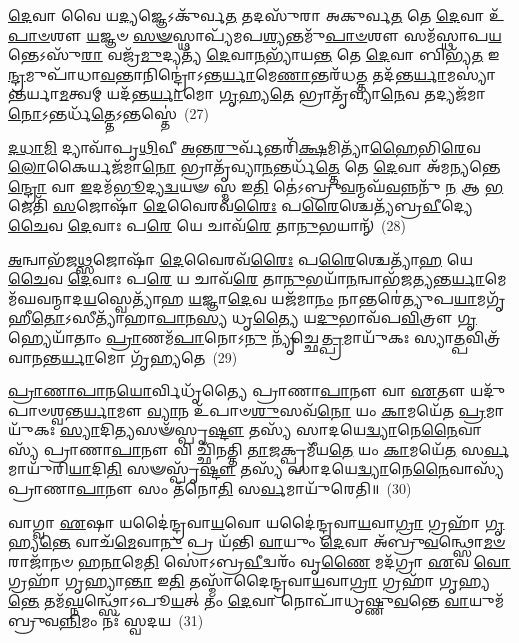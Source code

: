 \-\ul{𑌦𑍇}\-𑌵𑌾 𑌵𑍈 𑌯\-\ul{𑌦𑍍𑌯}\-𑌜𑍍𑌞𑍇\-𑌽𑌕𑍁᳴𑌰𑍍𑌵\-\ul{𑌤} 𑌤𑌦𑌸𑍁᳴𑌰𑌾 𑌅𑌕𑍁𑌰𑍍𑌵\-\ul{𑌤} 𑌤𑍇 \ul{𑌦𑍇}\-𑌵𑌾 𑌉᳴\-\ul{𑌪𑌾}\-\-\ul{𑍞}\-𑌶𑍗 \ul{𑌯}\-𑌜𑍍𑌞𑍞 \ul{𑌸}\-\-\ul{𑍟}\-𑌸𑍍𑌥𑌾𑌪𑍍𑌯᳴𑌮𑌪\-\ul{𑌶𑍍𑌯}\-𑌨𑍍𑌤𑌮𑍁᳴\-\ul{𑌪𑌾}\-\-\ul{𑍞}\-𑌶𑍗 𑌸𑌮᳴𑌸𑍍𑌥𑌾𑌪\-\ul{𑌯}\-𑌨𑍍𑌤𑍇\-𑌽𑌸𑍁᳴\-\ul{𑌰𑌾} 𑌵𑌜𑍍𑌰᳴\-\ul{𑌮𑍁}\-𑌦𑍍𑌯𑌤𑍍𑌯᳴ \ul{𑌦𑍇}\-𑌵𑌾\-\ul{𑌨}\-𑌭𑍍𑌯𑌾᳴𑌯\-\ul{𑌨𑍍𑌤} 𑌤𑍇 \ul{𑌦𑍇}\-𑌵𑌾 𑌬𑌿𑌭𑍍𑌯᳴\-\ul{𑌤} 𑌇\-\ul{𑌨𑍍𑌦𑍍𑌰}\-𑌮𑍁𑌪𑌾᳴𑌧𑌾\-\ul{𑌵}\-𑌨𑍍𑌤𑌾𑌨𑌿𑌨𑍍𑌦𑍍𑌰𑍋॑\-𑌽𑌨𑍍𑌤\-\ul{𑌰𑍍𑌯𑌾}\-𑌮𑍇\-\ul{𑌣𑌾}\-𑌨𑍍𑌤𑌰᳴𑌧\-\ul{𑌤𑍍𑌤} 𑌤𑌦᳴𑌨𑍍𑌤\-\ul{𑌰𑍍𑌯𑌾}\-𑌮𑌸𑍍𑌯𑌾॑𑌨𑍍𑌤𑌰𑍍𑌯𑌾\-\ul{𑌮}\-𑌤𑍍𑌵𑌮𑍍 𑌯𑌦᳴𑌨𑍍𑌤\-\ul{𑌰𑍍𑌯𑌾}\-𑌮𑍋 \ul{𑌗𑍃}\-𑌹𑍍𑌯\-\ul{𑌤𑍇} 𑌭𑍍𑌰𑌾𑌤𑍃᳴𑌵𑍍𑌯𑌾\-\ul{𑌨𑍇}\-𑌵 𑌤𑌦𑍍𑌯𑌜᳴𑌮𑌾\-\ul{𑌨𑍋}\-\-𑌽𑌨𑍍𑌤𑌰𑍍𑌧᳴\-\ul{𑌤𑍍𑌤𑍇}\-\-𑌽𑌨𑍍𑌤𑌸𑍍𑌤𑍇॑~(27)

\-\ul{𑌦}\-\-\ul{𑌧𑌾}\-\-\ul{𑌮𑌿} 𑌦𑍍𑌯𑌾𑌵𑌾᳴𑌪𑍃\-\ul{𑌥𑌿}\-𑌵𑍀 \ul{𑌅}\-𑌨𑍍𑌤\-\ul{𑌰𑍁}\-𑌰𑍍𑌵᳴𑌨𑍍𑌤𑌰𑌿᳴\-\ul{𑌕𑍍𑌷}\-𑌮𑌿𑌤𑍍𑌯𑌾᳴\-\ul{𑌹𑍈}\-𑌭𑌿\-\ul{𑌰𑍇}\-𑌵 \ul{𑌲𑍋}\-𑌕𑍈𑌰𑍍𑌯𑌜᳴𑌮𑌾\-\ul{𑌨𑍋} 𑌭𑍍𑌰𑌾𑌤𑍃᳴𑌵𑍍𑌯𑌾\-\ul{𑌨}\-𑌨𑍍𑌤𑌰𑍍𑌧᳴\-\ul{𑌤𑍍𑌤𑍇} 𑌤𑍇 \ul{𑌦𑍇}\-𑌵𑌾 𑌅᳴𑌮\-\ul{𑌨𑍍𑌯}\-𑌨𑍍𑌤𑍇\-\ul{𑌨𑍍𑌦𑍍𑌰𑍋} 𑌵𑌾 \ul{𑌇}\-𑌦𑌮᳴\-\ul{𑌭𑍂}\-𑌦𑍍𑌯\-\ul{𑌦𑍍𑌵}\-𑌯𑍟 𑌸𑍍𑌮 𑌇\-\ul{𑌤𑌿} 𑌤𑍇॑\-𑌽𑌬𑍍𑌰𑍁\-\ul{𑌵}\-𑌨𑍍𑌮𑌘᳴\-\ul{𑌵}\-𑌨𑍍𑌨𑌨𑍁᳴ \ul{𑌨} 𑌆 \ul{𑌭}\-𑌜𑍇𑌤𑌿᳴ \ul{𑌸}\-𑌜𑍋𑌷𑌾᳴ \ul{𑌦𑍇}\-𑌵𑍈𑌰𑌵᳴\-\ul{𑌰𑍈𑌃} 𑌪\-\ul{𑌰𑍈}\-𑌶𑍍𑌚𑍇𑌤𑍍𑌯᳴𑌬𑍍𑌰\-\ul{𑌵𑍀}\-𑌦𑍍𑌯𑍇 \ul{𑌚𑍈}\-𑌵 \ul{𑌦𑍇}\-𑌵𑌾𑌃 𑌪\-\ul{𑌰𑍇} 𑌯𑍇 𑌚𑌾𑌵᳴\-\ul{𑌰𑍇} 𑌤𑌾\-\ul{𑌨𑍁}\-𑌭𑌯𑌾𑌨𑍍᳴~(28)

\-\ul{𑌅}\-𑌨𑍍𑌵𑌾𑌭᳴𑌜\-\ul{𑌥𑍍𑌸}\-𑌜𑍋𑌷𑌾᳴ \ul{𑌦𑍇}\-𑌵𑍈𑌰𑌵᳴\-\ul{𑌰𑍈𑌃} 𑌪\-\ul{𑌰𑍈}\-𑌶𑍍𑌚𑍇𑌤𑍍𑌯𑌾᳴\-\ul{𑌹} 𑌯𑍇 \ul{𑌚𑍈}\-𑌵 \ul{𑌦𑍇}\-𑌵𑌾𑌃 𑌪\-\ul{𑌰𑍇} 𑌯 𑌚𑌾𑌵᳴\-\ul{𑌰𑍇} 𑌤𑌾\-\ul{𑌨𑍁}\-𑌭𑌯𑌾᳴\-\ul{𑌨}\-𑌨𑍍𑌵𑌾𑌭᳴𑌜𑌤𑍍𑌯𑌨𑍍𑌤\-\ul{𑌰𑍍𑌯𑌾}\-𑌮𑍇 𑌮᳴𑌘𑌵𑌨𑍍𑌮𑌾𑌦\-\ul{𑌯}\-𑌸𑍍𑌵𑍇𑌤𑍍𑌯𑌾᳴𑌹 \ul{𑌯}\-𑌜𑍍𑌞𑌾\-\ul{𑌦𑍇}\-𑌵 𑌯𑌜᳴𑌮𑌾\-\ul{𑌨𑌂} 𑌨𑌾𑌨𑍍𑌤𑌰𑍇॑𑌤𑍍𑌯𑍁𑌪\-\ul{𑌯𑌾}\-𑌮𑌗𑍃᳴𑌹𑍀\-\ul{𑌤𑍋}\-\-𑌽𑌸𑍀𑌤𑍍𑌯𑌾᳴𑌹𑌾\-\ul{𑌪𑌾}\-𑌨\-\ul{𑌸𑍍𑌯} 𑌧𑍃\-\ul{𑌤𑍍𑌯𑍈} 𑌯\-\ul{𑌦𑍁}\-𑌭𑌾𑌵᳴𑌪\-\ul{𑌵𑌿}\-𑌤𑍍𑌰𑍗 \ul{𑌗𑍃}\-𑌹𑍍𑌯𑍇𑌯𑌾᳴𑌤𑌾𑌂 \ul{𑌪𑍍𑌰𑌾}\-𑌣𑌮᳴\-\ul{𑌪𑌾}\-𑌨𑍋\-𑌽\-\ul{𑌨𑍁} 𑌨𑍍𑌯𑍃᳴𑌚𑍍𑌛𑍇\-\ul{𑌤𑍍𑌪𑍍𑌰}\-𑌮𑌾𑌯𑍁᳴𑌕𑌃 𑌸𑍍𑌯𑌾\-\ul{𑌤𑍍𑌪}\-𑌵𑌿𑌤𑍍𑌰᳴𑌵𑌾𑌨𑌨𑍍𑌤\-\ul{𑌰𑍍𑌯𑌾}\-𑌮𑍋 𑌗𑍃᳴𑌹𑍍𑌯𑌤𑍇~(29)

\-\ul{𑌪𑍍𑌰𑌾}\-\-\ul{𑌣𑌾}\-\-\ul{𑌪𑌾}\-𑌨\-\ul{𑌯𑍋}\-𑌰𑍍𑌵𑌿𑌧𑍃᳴𑌤𑍍𑌯𑍈 𑌪𑍍𑌰𑌾𑌣𑌾\-\ul{𑌪𑌾}\-𑌨𑍗 𑌵𑌾 \ul{𑌏}\-𑌤𑍗 𑌯𑌦𑍁᳴𑌪𑌾𑍞𑌶𑍍𑌵𑌨𑍍𑌤\-\ul{𑌰𑍍𑌯𑌾}\-𑌮𑍗 \ul{𑌵𑍍𑌯𑌾}\-𑌨 𑌉᳴𑌪𑌾𑍞\-\ul{𑌶𑍁}\-𑌸𑌵᳴\-\ul{𑌨𑍋} 𑌯𑌂 \ul{𑌕𑌾}\-𑌮𑌯𑍇᳴𑌤 \ul{𑌪𑍍𑌰}\-𑌮𑌾𑌯𑍁᳴𑌕𑌃 \ul{𑌸𑍍𑌯𑌾}\-𑌦𑌿𑌤𑍍𑌯𑌸𑍟᳴𑌸𑍍𑌪𑍃\-\ul{𑌷𑍍𑌟𑍗} 𑌤𑌸𑍍𑌯᳴ 𑌸𑌾𑌦𑌯𑍇\-\ul{𑌦𑍍𑌵𑍍𑌯𑌾}\-𑌨𑍇\-\ul{𑌨𑍈}\-𑌵𑌾𑌸𑍍𑌯᳴ 𑌪𑍍𑌰𑌾𑌣𑌾\-\ul{𑌪𑌾}\-𑌨𑍗 𑌵𑌿 𑌚𑍍𑌛𑌿᳴𑌨𑌤𑍍𑌤𑌿 \ul{𑌤𑌾}\-𑌜𑌕𑍍𑌪𑍍𑌰𑌮𑍀᳴𑌯\-\ul{𑌤𑍇} 𑌯𑌂 \ul{𑌕𑌾}\-𑌮𑌯𑍇᳴\-\ul{𑌤} 𑌸\-\ul{𑌰𑍍𑌵}\-𑌮𑌾𑌯𑍁᳴𑌰𑌿\-\ul{𑌯𑌾}\-𑌦𑌿\-\ul{𑌤𑌿} 𑌸𑍟𑌸𑍍𑌪𑍃᳴\-\ul{𑌷𑍍𑌟𑍗} 𑌤𑌸𑍍𑌯᳴ 𑌸𑌾𑌦𑌯𑍇\-\ul{𑌦𑍍𑌵𑍍𑌯𑌾}\-𑌨𑍇\-\ul{𑌨𑍈}\-𑌵𑌾𑌸𑍍𑌯᳴ 𑌪𑍍𑌰𑌾𑌣𑌾\-\ul{𑌪𑌾}\-𑌨𑍗 𑌸𑌂 𑌤᳴𑌨𑍋\-\ul{𑌤𑌿} 𑌸\-\ul{𑌰𑍍𑌵}\-𑌮𑌾𑌯𑍁᳴𑌰𑍇𑌤𑌿॥~(30)

{\anuvakamend[{\-\ul{𑌤} \ul{𑌉}\-𑌭𑌯𑌾॑𑌨𑍍𑌗𑍃𑌹𑍍𑌯\-\ul{𑌤𑍇} 𑌚𑌤𑍁᳴𑌶𑍍𑌚𑌤𑍍𑌵𑌾𑌰𑌿𑍞𑌶𑌚𑍍𑌚}]}%

𑌵𑌾𑌗𑍍𑌵𑌾 \ul{𑌏}\-𑌷𑌾 𑌯𑌦𑍈॑𑌨𑍍𑌦𑍍𑌰𑌵𑌾\-\ul{𑌯}\-𑌵𑍋 𑌯𑌦𑍈॑𑌨𑍍𑌦𑍍𑌰𑌵𑌾\-\ul{𑌯}\-𑌵𑌾\-\ul{𑌗𑍍𑌰𑌾} 𑌗𑍍𑌰𑌹𑌾᳴ \ul{𑌗𑍃}\-𑌹𑍍𑌯\-\ul{𑌨𑍍𑌤𑍇} 𑌵𑌾𑌚᳴\-\ul{𑌮𑍇}\-𑌵𑌾\-\ul{𑌨𑍁} 𑌪𑍍𑌰 𑌯᳴𑌨𑍍𑌤𑌿 \ul{𑌵𑌾}\-𑌯𑍁𑌂 \ul{𑌦𑍇}\-𑌵𑌾 𑌅᳴𑌬𑍍𑌰𑍁\-\ul{𑌵}\-𑌨𑍍𑌥𑍍𑌸𑍋\-\ul{𑌮}\-\-\ul{𑍞} 𑌰𑌾𑌜𑌾᳴𑌨𑍞 𑌹\-\ul{𑌨𑌾}\-𑌮𑍇\-\ul{𑌤𑌿} 𑌸𑍋॑\-𑌽𑌬𑍍𑌰\-\ul{𑌵𑍀}\-𑌦𑍍𑌵𑌰𑌂᳴ 𑌵𑍃\-\ul{𑌣𑍈} 𑌮𑌦᳴𑌗𑍍𑌰𑌾 \ul{𑌏}\-𑌵 \ul{𑌵𑍋} 𑌗𑍍𑌰𑌹𑌾᳴ 𑌗𑍃𑌹𑍍𑌯𑌾\-\ul{𑌨𑍍𑌤𑌾} 𑌇\-\ul{𑌤𑌿} 𑌤𑌸𑍍𑌮𑌾᳴𑌦𑍈𑌨𑍍𑌦𑍍𑌰𑌵𑌾\-\ul{𑌯}\-𑌵𑌾\-\ul{𑌗𑍍𑌰𑌾} 𑌗𑍍𑌰𑌹𑌾᳴ 𑌗𑍃𑌹𑍍𑌯\-\ul{𑌨𑍍𑌤𑍇} 𑌤𑌮᳴\-\ul{𑌘𑍍𑌨}\-𑌨𑍍𑌥𑍍𑌸𑍋᳴\-𑌽𑌪𑍂\-\ul{𑌯}\-𑌤𑍍 𑌤𑌂 \ul{𑌦𑍇}\-𑌵𑌾 𑌨𑍋𑌪𑌾᳴𑌧𑍃𑌷𑍍𑌣𑍁\-\ul{𑌵}\-𑌨𑍍𑌤𑍇 \ul{𑌵𑌾}\-𑌯𑍁𑌮᳴𑌬𑍍𑌰𑍁𑌵\-\ul{𑌨𑍍𑌨𑌿}\-𑌮𑌂 𑌨𑌃᳴ 𑌸𑍍𑌵𑌦𑌯~(31)

